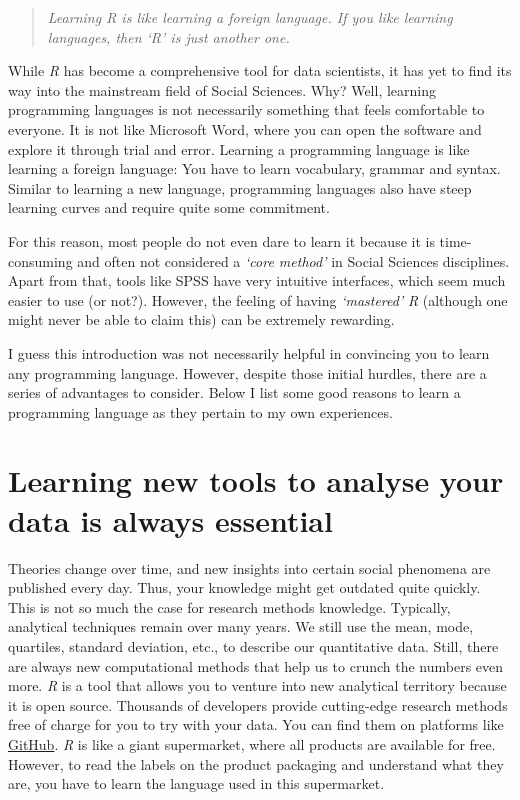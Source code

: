 \documentclass[
]{book}
\begin{document}
\begin{quote}
\emph{Learning R is like learning a foreign language. If you like learning languages, then `R' is just another one.}
\end{quote}

While \emph{R} has become a comprehensive tool for data scientists, it has yet to find its way into the mainstream field of Social Sciences. Why? Well, learning programming languages is not necessarily something that feels comfortable to everyone. It is not like Microsoft Word, where you can open the software and explore it through trial and error. Learning a programming language is like learning a foreign language: You have to learn vocabulary, grammar and syntax. Similar to learning a new language, programming languages also have steep learning curves and require quite some commitment.

For this reason, most people do not even dare to learn it because it is time-consuming and often not considered a \emph{`core method'} in Social Sciences disciplines. Apart from that, tools like SPSS have very intuitive interfaces, which seem much easier to use (or not?). However, the feeling of having \emph{`mastered'} \emph{R} (although one might never be able to claim this) can be extremely rewarding.

I guess this introduction was not necessarily helpful in convincing you to learn any programming language. However, despite those initial hurdles, there are a series of advantages to consider. Below I list some good reasons to learn a programming language as they pertain to my own experiences.

\hypertarget{learning-new-tools-to-analyse-your-data-is-always-essential}{%
\section{Learning new tools to analyse your data is always essential}\label{learning-new-tools-to-analyse-your-data-is-always-essential}}

Theories change over time, and new insights into certain social phenomena are published every day. Thus, your knowledge might get outdated quite quickly. This is not so much the case for research methods knowledge. Typically, analytical techniques remain over many years. We still use the mean, mode, quartiles, standard deviation, etc., to describe our quantitative data. Still, there are always new computational methods that help us to crunch the numbers even more. \emph{R} is a tool that allows you to venture into new analytical territory because it is open source. Thousands of developers provide cutting-edge research methods free of charge for you to try with your data. You can find them on platforms like \href{https://github.com}{GitHub}. \emph{R} is like a giant supermarket, where all products are available for free. However, to read the labels on the product packaging and understand what they are, you have to learn the language used in this supermarket.
\end{document}
